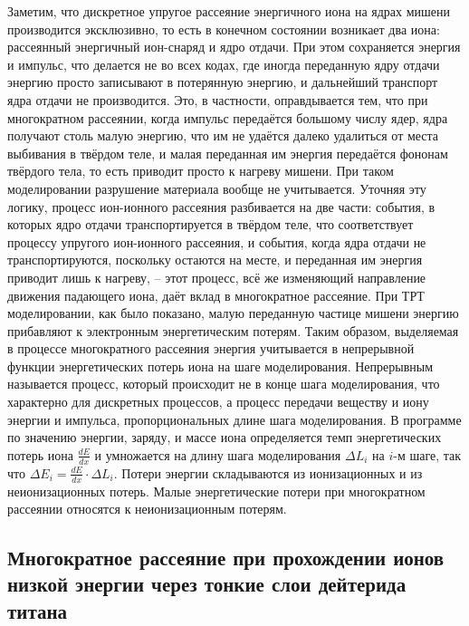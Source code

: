 \documentclass[a4paper,12pt]{article}
\begin{document}
\begin{large}
	Заметим, что дискретное упругое рассеяние энергичного иона на ядрах мишени производится эксклюзивно, то есть в конечном состоянии возникает два иона: рассеянный энергичный ион-снаряд и ядро отдачи.
	При этом сохраняется энергия и импульс, что делается не во всех кодах, где иногда переданную ядру отдачи энергию просто записывают в потерянную энергию, и дальнейший транспорт ядра отдачи не производится.
	Это, в частности, оправдывается тем, что при многократном рассеянии, когда импульс передаётся большому числу ядер, ядра получают столь малую энергию, что им не удаётся далеко удалиться от места выбивания в твёрдом теле, и малая переданная им энергия передаётся фононам твёрдого тела, то есть приводит просто к нагреву мишени.
	При таком моделировании разрушение материала вообще не учитывается.
	Уточняя эту логику, процесс ион-ионного рассеяния разбивается на две части: события, в которых ядро отдачи транспортируется в твёрдом теле, что соответствует процессу упругого ион-ионного рассеяния, и события, когда ядра отдачи не транспортируются, поскольку остаются на месте, и переданная им энергия приводит лишь к нагреву, -- этот процесс, всё же изменяющий направление движения падающего иона, даёт вклад в многократное рассеяние.
	При ТРТ моделировании, как было показано, малую переданную частице мишени энергию прибавляют к электронным энергетическим потерям.
	Таким образом, выделяемая в процессе многократного рассеяния энергия учитывается в непрерывной функции энергетических потерь иона на шаге моделирования.
	Непрерывным называется процесс, который происходит не в конце шага моделирования, что характерно для дискретных процессов, а процесс передачи веществу и иону энергии и импульса, пропорциональных длине шага моделирования.
	В программе по значению энергии, заряду, и массе иона определяется темп энергетических потерь иона $\frac{dE}{dx}$ и умножается на длину шага моделирования $\Delta L_i$ на $i$-м шаге, так что $\Delta E_i=\frac{dE}{dx}\cdot\Delta L_i$.
	Потери энергии складываются из ионизационных и из неионизационных потерь.
	Малые энергетические потери при многократном рассеянии относятся к неионизационным потерям.

\subsection{Многократное рассеяние при прохождении ионов низкой энергии через тонкие слои дейтерида титана}
\label{subPol2}


\end{large}
\end{document}
